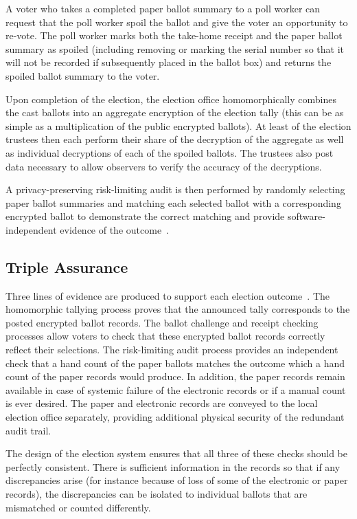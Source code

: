 \documentclass[letterpaper, 10pt, twocolumn]{article}
\begin{document}
A voter who takes a completed paper ballot summary to a poll worker can request that the poll worker spoil the ballot and give the voter an opportunity to re-vote.  
The poll worker marks both the take-home receipt and the paper ballot summary as spoiled (including removing or marking the serial number so that it will not be recorded if subsequently placed in the ballot box) and returns the spoiled ballot summary to the voter.

Upon completion of the election, the election office homomorphically combines the cast ballots into an aggregate encryption of the election tally (this can be as simple as a multiplication of the public encrypted ballots).  At least  of the election trustees then each perform their share of the decryption of the aggregate as well as individual decryptions of each of the spoiled ballots.  The trustees also post data necessary to allow observers to verify the accuracy of the decryptions.

A privacy-preserving risk-limiting audit is then performed by randomly selecting paper ballot summaries and matching each selected ballot with a corresponding encrypted ballot to demonstrate the correct matching and provide software-independent evidence of the outcome~\cite{rivest06sivoting,lindemanStark12,starkWagner12}.

\subsection{Triple Assurance}

Three lines of evidence are produced to support each election outcome~\cite{starkWagner12}.  The homomorphic tallying process proves that the announced tally corresponds to the posted encrypted ballot records.  The ballot challenge and receipt checking processes allow voters to check that these encrypted ballot records correctly reflect their selections.  The risk-limiting audit process provides an independent check that a hand count of the paper ballots matches the outcome which a hand count of the paper records would produce.  In addition, the 
paper records remain available in case of systemic failure of the electronic records or 
if a manual count is ever desired.
The paper and electronic records are conveyed to the local election office separately, providing
additional physical security of the redundant audit trail.

The design of the election system ensures that all three of these checks should be perfectly consistent.  There is sufficient information in the records so that if any discrepancies arise (for instance because of loss of some of the electronic or paper records), the discrepancies can be isolated to individual ballots that are mismatched or counted differently.
\end{document}
